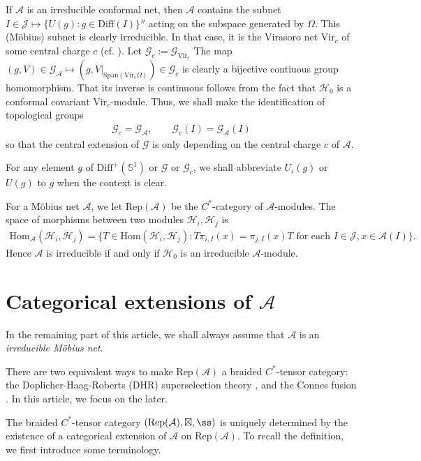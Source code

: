 \documentclass[12pt,a4paper,notitlepage]{article}
\theoremstyle{definition}
\theoremstyle{plain}
\newcommand{\mc}{\mathcal}
\newcommand{\ovl}{\overline}
\newcommand{\Hom}{\mathrm{Hom}}
\newcommand{\Rep}{\mathrm{Rep}}
\newcommand{\Diffp}{\mathrm{Diff}^+}
\newcommand{\Diff}{\mathrm{Diff}}
\newcommand{\Vir}{\mathrm{Vir}}
\newcommand{\Span}{\mathrm{Span}}
\newcommand{\GA}{\mathscr G_{\mathcal A}}
\newcommand{\scr}{\mathscr}
\newcommand{\Sbb}{{\mathbb S}}
\newcommand{\Gc}{\mathscr G_c}
\numberwithin{equation}{section}
\begin{document}
If $\mc A$ is an irreducible conformal net, then $\mc A$ contains the subnet  $I\in\mc J\mapsto \{U(g):g\in\Diff(I)\}''$ acting on the subspace generated by $\Omega$. This (M\"obius) subnet is clearly irreducible.  In that case, it is the Virasoro net $\Vir_c$ of some central charge $c$ (cf. \cite[Thm. A.1]{Car04}). Let $\Gc:=\scr G_{\Vir_c}$ The map $(g,V)\in\GA\mapsto (g,V|_{\ovl{\Span(\Vir_c\Omega)}})\in\Gc$ is clearly a bijective contiuous group homomorphism. That its inverse is continuous follows from the fact that $\mc H_0$ is a conformal covariant $\Vir_c$-module. Thus, we shall make the identification of topological groups
\begin{align*}
	\Gc=\GA,\qquad \Gc(I)=\GA(I)	
\end{align*}
so that the central extension of $\scr G$ is only depending on the central charge $c$ of $\mc A$.

For any element $g$ of $\Diffp(\Sbb^1)$ or $\scr G$ or $\scr G_c$, we shall abbreviate $U_i(g)$ or $U(g)$ to $g$ when the context is clear.

For a M\"obius net $\mc A$, we let $\Rep(\mc A)$ be the $C^*$-category of $\mc A$-modules. The space of morphisms between two modules $\mc H_i,\mc H_j$ is
\begin{align*}
\Hom_{\mc A}(\mc H_i,\mc H_j)=\{T\in\Hom(\mc H_i,\mc H_j):T\pi_{i,I}(x)=\pi_{j,I}(x)T\text{ for each $I\in\mc J,x\in\mc A(I)$}\}.	
\end{align*}
Hence $\mc A$ is irreducible if and only if $\mc H_0$ is an irreducible $\mc A$-module.

\section*{Categorical extensions of $\mc A$}

In the remaining part of this article, we shall always assume that $\mc A$ is an \emph{irreducible M\"obius net}. 




There are two equivalent ways to make $\Rep(\mc A)$ a braided $C^*$-tensor category: the Doplicher-Haag-Roberts (DHR) superselection theory \cite{DHR71,DHR74,FRS89,FRS92}, and the Connes fusion \cite{Con80,Sau83,Was98,BDH17}. In this article, we focus on the later. 

The braided $C^*$-tensor category $(\Rep(\mc A),\boxtimes,\ss)$ is uniquely determined by the existence of a categorical extension of $\mc A$ on $\Rep(\mc A)$. To recall the definition, we first introduce some terminology.
\end{document}
